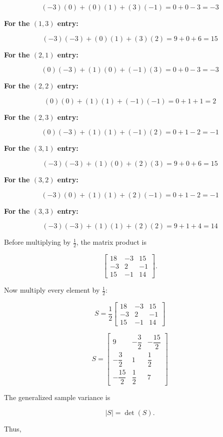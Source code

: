 \documentclass{article}
\begin{document}
$$
(-3)(0) + (0)(1) + (3)(-1)
=
0 + 0 - 3
=
-3
$$

\noindent
\textbf{For the $(1,3)$ entry:}

$$
(-3)(-3) + (0)(1) + (3)(2)
=
9 + 0 + 6
=
15
$$

\noindent
\textbf{For the $(2,1)$ entry:}

$$
(0)(-3) + (1)(0) + (-1)(3)
=
0 + 0 - 3
=
-3
$$

\noindent
\textbf{For the $(2,2)$ entry:}

$$
(0)(0) + (1)(1) + (-1)(-1)
=
0 + 1 + 1
=
2
$$

\noindent
\textbf{For the $(2,3)$ entry:}

$$
(0)(-3) + (1)(1) + (-1)(2)
=
0 + 1 - 2
=
-1
$$

\noindent
\textbf{For the $(3,1)$ entry:}

$$
(-3)(-3) + (1)(0) + (2)(3)
=
9 + 0 + 6
=
15
$$

\noindent
\textbf{For the $(3,2)$ entry:}

$$
(-3)(0) + (1)(1) + (2)(-1)
=
0 + 1 - 2
=
-1
$$

\noindent
\textbf{For the $(3,3)$ entry:}

$$
(-3)(-3) + (1)(1) + (2)(2)
=
9 + 1 + 4
=
14
$$

\noindent
Before multiplying by $\frac{1}{2}$, the matrix product is

$$
\begin{bmatrix}
18 & -3 & 15 \\
-3 & 2 & -1 \\
15 & -1 & 14
\end{bmatrix}.
$$

\noindent
Now multiply every element by $\frac{1}{2}$:

$$
S =
\frac{1}{2}
\begin{bmatrix}
18 & -3 & 15 \\
-3 & 2 & -1 \\
15 & -1 & 14
\end{bmatrix}
$$

$$
\boxed{
S=
\begin{bmatrix}
9&-\dfrac32&-\dfrac{15}{2}\\[0.5em]
-\dfrac32&1&\dfrac12\\[0.5em]
-\dfrac{15}{2}&\dfrac12&7
\end{bmatrix}}
$$

The generalized sample variance is

$$
|S|=\det(S).
$$

Thus,
\end{document}
